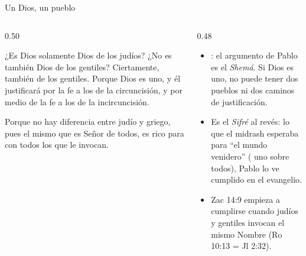 \begin{frame}{Un Dios, un pueblo}
\begin{columns}[t,onlytextwidth]
\begin{column}{0.50\textwidth}
\begin{cita}[fontupper=\scriptsize\itshape]¿Es Dios solamente Dios de los judíos? ¿No es también Dios de los gentiles? Ciertamente, también de los gentiles. Porque Dios es uno, y él justificará por la fe a los de la circuncisión, y por medio de la fe a los de la incircuncisión.\end{cita}
\begin{cita}[fontupper=\scriptsize\itshape]Porque no hay diferencia entre judío y griego, pues el mismo que es Señor de todos, es rico para con todos los que le invocan.\end{cita}
\end{column}
\begin{column}{0.48\textwidth}\small
\begin{itemize}
\item {}: el argumento de Pablo es el \emph{Shemá}. Si Dios es uno, no puede tener dos pueblos ni dos caminos de justificación.
\item Es el \emph{Sifré} al revés: lo que el midrash esperaba para ``el mundo venidero'' (\SENOR{} uno sobre todos), Pablo lo ve cumplido en el evangelio.
\item Zac 14:9 empieza a cumplirse cuando judíos y gentiles invocan el mismo Nombre (Ro 10:13 = Jl 2:32).
\end{itemize}
\end{column}
\end{columns}
\end{frame}


